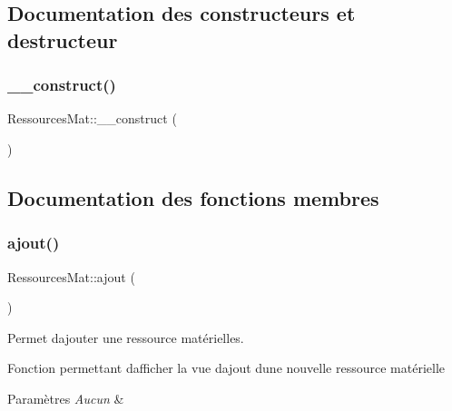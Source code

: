 \subsection{Documentation des constructeurs et destructeur}
\mbox{\label{class_ressources_mat_a887de1b42531d40174febdc19f1acbad}} 
\subsubsection{\texorpdfstring{\+\_\+\+\_\+construct()}{\_\_construct()}}
{\footnotesize\ttfamily Ressources\+Mat\+::\+\_\+\+\_\+construct (\begin{DoxyParamCaption}{ }\end{DoxyParamCaption})}



\subsection{Documentation des fonctions membres}
\mbox{\label{class_ressources_mat_a35e8eb66e536efc675f7e0accbbbfbf1}} 
\subsubsection{\texorpdfstring{ajout()}{ajout()}}
{\footnotesize\ttfamily Ressources\+Mat\+::ajout (\begin{DoxyParamCaption}{ }\end{DoxyParamCaption})}



Permet d\textquotesingle{}ajouter une ressource matérielles. 

Fonction permettant d\textquotesingle{}afficher la vue d\textquotesingle{}ajout d\textquotesingle{}une nouvelle ressource matérielle 
\begin{DoxyParams}{Paramètres}
{\em Aucun} & \\
\hline
\end{DoxyParams}
\mbox{\label{class_ressources_mat_a0c2e974f15851cc42afa8f5428581818}} 
